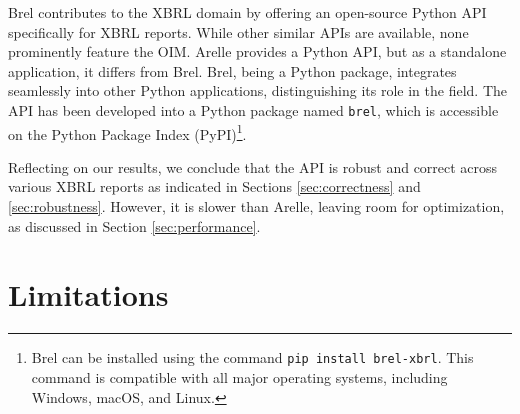 Brel contributes to the XBRL domain by offering an open-source Python API specifically for XBRL reports.
While other similar APIs are available, none prominently feature the OIM.
Arelle provides a Python API, but as a standalone application, it differs from Brel.
Brel, being a Python package, integrates seamlessly into other Python applications, distinguishing its role in the field.
The API has been developed into a Python package named \texttt{brel},
which is accessible on the Python Package Index (PyPI)\footnote{Brel can be installed using the command \texttt{pip install brel-xbrl}. This command is compatible with all major operating systems, including Windows, macOS, and Linux.}.

Reflecting on our results, we conclude that the API is robust and correct across various XBRL reports
as indicated in Sections \ref{sec:correctness} and \ref{sec:robustness}.
However, it is slower than Arelle, leaving room for optimization, as discussed in Section \ref{sec:performance}.

\section{Limitations}

